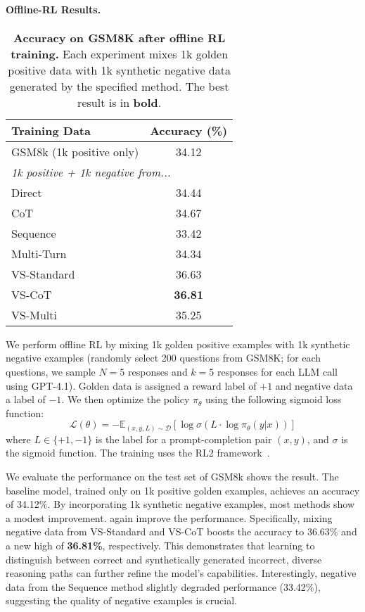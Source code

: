 \paragraph{Offline-RL Results.}
\begin{table}[h]
\centering
\caption{\textbf{Accuracy on GSM8K after offline RL training.} Each experiment mixes 1k golden positive data with 1k synthetic negative data generated by the specified method. The best result is in \textbf{bold}.}
\label{tab:negative_data_training}
\begin{tabular}{lc}
\toprule
\textbf{Training Data} & \textbf{Accuracy (\%)} \\
\midrule
GSM8k (1k positive only) & 34.12 \\
\midrule
\multicolumn{2}{l}{\textit{1k positive + 1k negative from...}} \\
\quad Direct & 34.44 \\
\quad CoT & 34.67 \\
\quad Sequence & 33.42 \\
\quad Multi-Turn & 34.34 \\
\quad VS-Standard & 36.63 \\
\quad VS-CoT & \textbf{36.81} \\
\quad VS-Multi & 35.25 \\
\bottomrule
\end{tabular}
\end{table}
We perform offline RL by mixing 1k golden positive examples with 1k synthetic negative examples (randomly select 200 questions from GSM8K; for each questions, we sample $N=5$ responses and $k=5$ responses for each LLM call using GPT-4.1). Golden data is assigned a reward label of $+1$ and negative data a label of $-1$. We then optimize the policy $\pi_{\theta}$ using the following sigmoid loss function:
$$
\mathcal{L}(\theta) = -\mathbb{E}_{(x, y, L) \sim \mathcal{D}} \left[ \log \sigma \left( L \cdot \log \pi_{\theta}(y|x) \right) \right]
$$
where $L \in \{+1, -1\}$ is the label for a prompt-completion pair $(x, y)$, and $\sigma$ is the sigmoid function. The training uses the RL2 framework~\citep{Tan2025RL2}.

We evaluate the performance on the test set of GSM8k 
 shows the result. The baseline model, trained only on 1k positive golden examples, achieves an accuracy of 34.12\%. By incorporating 1k synthetic negative examples, most methods show a modest improvement. \ours again improve the performance. Specifically, mixing negative data from {VS-Standard} and {VS-CoT} boosts the accuracy to 36.63\% and a new high of \textbf{36.81\%}, respectively. This demonstrates that learning to distinguish between correct and synthetically generated incorrect, diverse reasoning paths can further refine the model's capabilities. Interestingly, negative data from the {Sequence} method slightly degraded performance (33.42\%), suggesting the quality of negative examples is crucial.

